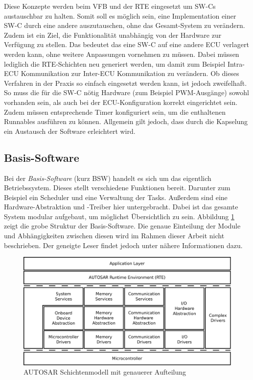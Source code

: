 \documentclass[
  a4paper,					    %
  twoside,
  DIV=calc,     				%
  bibliography=totoc,
  cleardoublepage=empty,
  ngerman,     					%
  final       					%
]{scrbook}
\begin{document}
Diese Konzepte werden beim VFB und der RTE eingesetzt um SW-Cs austauschbar zu halten. Somit soll es möglich sein, eine Implementation einer SW-C durch eine andere auszutauschen, ohne das Gesamt-System zu verändern. Zudem ist ein Ziel, die Funktionalität unabhängig von der Hardware zur Verfügung zu stellen. Das bedeutet das eine SW-C auf eine andere ECU verlagert werden kann, ohne weitere Anpassungen vornehmen zu müssen. Dabei müssen lediglich die RTE-Schichten neu generiert werden, um damit zum Beispiel Intra-ECU Kommunikation zur Inter-ECU Kommunikation zu verändern. Ob dieses Verfahren in der Praxis so einfach eingesetzt werden kann, ist jedoch zweifelhaft. So muss die für die SW-C nötig Hardware (zum Beispiel PWM-Ausgänge) sowohl vorhanden sein, als auch bei der ECU-Konfiguration korrekt eingerichtet sein. Zudem müssen entsprechende Timer konfiguriert sein, um die enthaltenen Runnables ausführen zu können. Allgemein gilt jedoch, dass durch die Kapselung ein Austausch der Software erleichtert wird.









\subsection{Basis-Software}
\label{sec:bsw}
Bei der \emph{Basis-Software} (kurz BSW) handelt es sich um das eigentlich Betriebssystem. Dieses stellt verschiedene Funktionen bereit. Darunter zum Beispiel ein Scheduler und eine Verwaltung der Tasks. Außerdem sind eine Hardware-Abstraktion und -Treiber hier untergebracht. Dabei ist das gesamte System modular aufgebaut, um möglichst Übersichtlich zu sein. Abbildung \ref{fig:autosar_refined_layer} zeigt die grobe Struktur der Basis-Software. Die genaue Einteilung der Module und Abhängigkeiten zwischen diesen wird im Rahmen dieser Arbeit nicht beschrieben. Der geneigte Leser findet jedoch unter \cite{autosar_layer} nähere Informationen dazu.

\begin{figure}[ht]
    \centering
    \includegraphics[width=1\textwidth]{autosar_refined_layer}
    \caption{AUTOSAR Schichtenmodell mit genauerer Aufteilung}
    \label{fig:autosar_refined_layer}
\end{figure}
\end{document}
